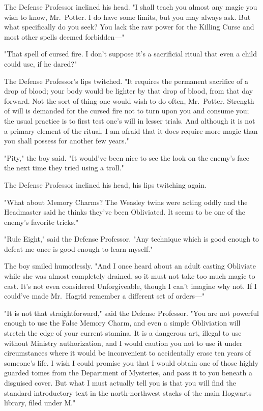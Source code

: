 The Defense Professor inclined his head. "I shall teach you almost any magic 
you wish to know, Mr.~Potter. I do have some limits, but you may always ask. 
But what specifically do you seek? You lack the raw power for the Killing Curse 
and most other spells deemed forbidden---"

"That spell of cursed fire. I don't suppose it's a sacrificial ritual that even 
a child could use, if he dared?"

The Defense Professor's lips twitched. "It requires the permanent sacrifice of 
a drop of blood; your body would be lighter by that drop of blood, from that 
day forward. Not the sort of thing one would wish to do often, Mr.~Potter. 
Strength of will is demanded for the cursed fire not to turn upon you and 
consume you; the usual practice is to first test one's will in lesser trials. 
And although it is not a primary element of the ritual, I am afraid that it 
does require more magic than you shall possess for another few years."

"Pity," the boy said. "It would've been nice to see the look on the enemy's 
face the next time they tried using a troll."

The Defense Professor inclined his head, his lips twitching again.

"What about Memory Charms? The Weasley twins were acting oddly and the 
Headmaster said he thinks they've been Obliviated. It seems to be one of the 
enemy's favorite tricks."

"Rule Eight," said the Defense Professor. "Any technique which is good enough 
to defeat me once is good enough to learn myself."

The boy smiled humorlessly. "And I once heard about an adult casting Obliviate 
while she was almost completely drained, so it must not take too much magic to 
cast. It's not even considered Unforgiveable, though I can't imagine why not. 
If I could've made Mr.~Hagrid remember a different set of orders---"

"It is not that straightforward," said the Defense Professor. "You are not 
powerful enough to use the False Memory Charm, and even a simple Obliviation 
will stretch the edge of your current stamina. It is a dangerous art, illegal 
to use without Ministry authorization, and I would caution you not to use it 
under circumstances where it would be inconvenient to accidentally erase ten 
years of someone's life. I wish I could promise you that I would obtain one of 
those highly guarded tomes from the Department of Mysteries, and pass it to you 
beneath a disguised cover. But what I must actually tell you is that you will 
find the standard introductory text in the north-northwest stacks of the main 
Hogwarts library, filed under M."


